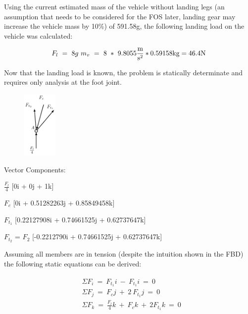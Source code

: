 \documentclass[12pt,letterpaper]{article}
\begin{document}
Using the current estimated mass of the vehicle without landing legs (an assumption that needs to be considered for the FOS later, landing gear may increase the vehicle mass by 10\%) of 591.58\unit{\g}, the following landing load on the vehicle was calculated:

\begin{gather*}
    F_l~=~8g~m_v~=~8~*~9.8055\unit[per-mode = fraction]{\m\per\s\squared} * 0.59158\unit{\kg} = 46.4\unit{\N}
\end{gather*}

Now that the landing load is known, the problem is statically determinate and requires only analysis at the foot joint.

\pagebreak

\begin{figure}[h!]
\centering
\includegraphics[width = 0.15\textwidth]{Landing_Legs_Fig/FBD_point_A.pdf}
\end{figure}


\begin{description}
    \item Vector Components:
    \item $\frac{F_l}{4}$ [0i + 0j + 1k]
    \item $F_c$ [0i + 0.51282263j  + 0.85849458k]
    \item $F_{t_1}$ [0.22127908i + 0.74661525j + 0.62737647k]
    \item $F_{t_2}$ = $F_2$ [-0.2212790i + 0.74661525j + 0.62737647k]
\end{description}

Assuming all members are in tension (despite the intuition shown in the FBD) the following static equations can be derived:

\begin{gather}
\begin{aligned}
    & \Sigma F_i~=~F_{t_1}i~-~F_{t_1}i~=~0
    \\
    & \Sigma F_j~=~F_cj~+~2~F_{t_1}j~=~0 
    \\
    & \Sigma F_k~=~\frac{F_l}{4}k~+~F_ck~+~2F_{t_1}k~=~0 
\end{aligned}
\end{gather}
\end{document}
